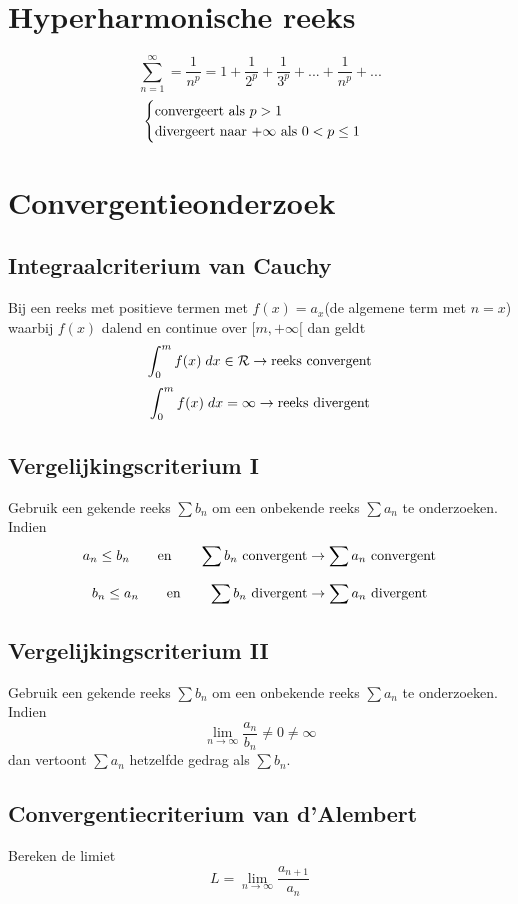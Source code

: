 \documentclass{report}
\begin{document}
\section*{Hyperharmonische reeks}
$$\sum_{n = 1}^{\infty} = \frac{1}{n^p} = 1 + \frac{1}{2^p} + \frac{1}{3^p} + ... + \frac{1}{n^p} + ...$$
$$\begin{cases}
   \hbox{convergeert als } p > 1 \\
   \hbox{divergeert naar +}\infty \hbox{ als } 0 < p \leq 1 \\
  \end{cases}
$$

\section*{Convergentieonderzoek}
\subsection*{Integraalcriterium van Cauchy}
Bij een reeks met positieve termen met $f(x) = a_x$(de algemene term met $n = x$) waarbij $f(x)$ dalend en continue over $[m , +\infty[$ dan geldt
$$\int_0^m f(x)\;dx \in \mathcal{R} \rightarrow \hbox{reeks convergent}$$
$$\int_0^m f(x)\;dx = \infty \rightarrow \hbox{reeks divergent} $$

\subsection*{Vergelijkingscriterium I}
Gebruik een gekende reeks $\sum b_n$ om een onbekende reeks $\sum a_n$ te onderzoeken. Indien
$$a_n \leq b_n \qquad \hbox{en} \qquad \sum b_n \hbox{  convergent} \rightarrow \sum a_n \hbox {  convergent}$$

$$b_n \leq a_n \qquad \hbox{en} \qquad \sum b_n \hbox{  divergent} \rightarrow \sum a_n \hbox {  divergent}$$
\subsection*{Vergelijkingscriterium II}
Gebruik een gekende reeks $\sum b_n$ om een onbekende reeks $\sum a_n$ te onderzoeken. Indien 
$$\lim\limits_{n\to\infty} \frac{a_n}{b_n} \neq 0 \neq \infty$$
dan vertoont $\sum a_n$ hetzelfde gedrag als $\sum b_n$.

\subsection*{Convergentiecriterium van d'Alembert}
Bereken de limiet
$$L = \lim\limits_{n\to\infty} \frac{a_{n+1}}{a_n}$$
\end{document}
